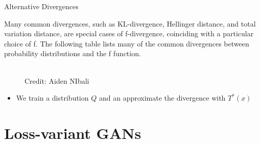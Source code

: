 \begin{frame} {Alternative Divergences}

Many common divergences, such as KL-divergence, Hellinger distance, and total variation distance, are special cases of f-divergence, coinciding with a particular choice of f. The following table lists many of the common divergences between probability distributions and the f function.

  \begin{figure}
    \centering
      \tiny{\\Credit: Aiden NIbali}
  \end{figure}
  \begin{itemize}
    \item We train a distribution $Q$ and an approximate the divergence with $T^{*}(x)$
  \end{itemize}
\end{frame}

\section{Loss-variant GANs}

